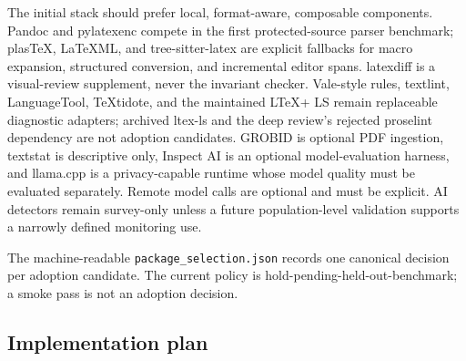 \documentclass[11pt]{article}
\begin{document}
The initial stack should prefer local, format-aware, composable components. Pandoc and pylatexenc compete in the first protected-source parser benchmark; plasTeX, LaTeXML, and tree-sitter-latex are explicit fallbacks for macro expansion, structured conversion, and incremental editor spans. latexdiff is a visual-review supplement, never the invariant checker. Vale-style rules, textlint, LanguageTool, TeXtidote, and the maintained LTeX+ LS remain replaceable diagnostic adapters; archived ltex-ls and the deep review's rejected proselint dependency are not adoption candidates. GROBID is optional PDF ingestion, textstat is descriptive only, Inspect AI is an optional model-evaluation harness, and llama.cpp is a privacy-capable runtime whose model quality must be evaluated separately. Remote model calls are optional and must be explicit. AI detectors remain survey-only unless a future population-level validation supports a narrowly defined monitoring use.

The machine-readable \texttt{package\_selection.json} records one canonical decision per adoption candidate. The current policy is hold-pending-held-out-benchmark; a smoke pass is not an adoption decision.

\hypertarget{implementation-plan}{%
\subsection{Implementation plan}\label{implementation-plan}}
\end{document}
